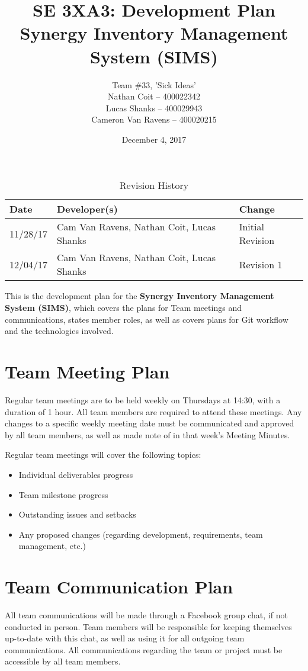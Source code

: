 \documentclass{article}
\title{SE 3XA3: Development Plan\\Synergy Inventory Management System (SIMS)}
\author{Team \#33, 'Sick Ideas'
		\\ Nathan Coit -- 400022342
		\\ Lucas Shanks -- 400029943
		\\ Cameron Van Ravens -- 400020215
}
\date{December 4, 2017}
\begin{document}
\maketitle
\newpage

\begin{table}[hp]
\caption{Revision History} \label{TblRevisionHistory}
\begin{tabularx}{\textwidth}{llX}
\toprule
\textbf{Date} & \textbf{Developer(s)} & \textbf{Change}\\
\midrule
11/28/17 & Cam Van Ravens, Nathan Coit, Lucas Shanks & Initial Revision\\
12/04/17 & Cam Van Ravens, Nathan Coit, Lucas Shanks & Revision 1\\
\bottomrule
\end{tabularx}
\end{table}

\newpage

This is the development plan for the \textbf{Synergy Inventory Management System (SIMS)}, which covers the plans for Team meetings and communications, states member roles, as well as covers plans for Git workflow and the technologies involved.

\section{Team Meeting Plan}
Regular team meetings are to be held weekly on Thursdays at 14:30, with a duration of 1 hour. All team members are required to attend these meetings. Any changes to a specific weekly meeting date must be communicated and approved by all team members, as well as made note of in that week's Meeting Minutes. 

Regular team meetings will cover the following topics:
\begin{itemize}
    \item Individual deliverables progress
    \item Team milestone progress
    \item Outstanding issues and setbacks
    \item Any proposed changes (regarding development, requirements, team management, etc.)
\end{itemize}


\section{Team Communication Plan}
All team communications will be made through a Facebook group chat, if not conducted in person. Team members will be responsible for keeping themselves up-to-date with this chat, as well as using it for all outgoing team communications. All communications regarding the team or project must be accessible by all team members.
\end{document}
